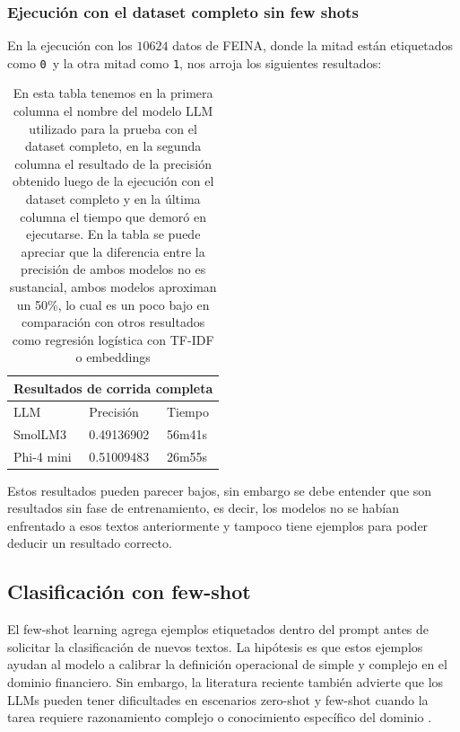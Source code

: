 \documentclass[12pt]{article}
\newcommand{\claseSimple}{\texttt{0}}
\newcommand{\claseCompleja}{\texttt{1}}
\begin{document}
\subsubsection{Ejecución con el dataset completo sin few shots}

En la ejecución con los $10624$ datos de FEINA, donde la mitad están etiquetados como \claseSimple \ y la otra mitad como \claseCompleja, nos arroja los siguientes resultados:

\begin{table}[H]
\centering
\begin{tabular}{lll}
\multicolumn{3}{c}{Resultados de corrida completa} \\
\toprule
LLM & Precisión & Tiempo \\
\midrule
SmolLM3 & 0.49136902 & 56m41s \\
Phi-4 mini & 0.51009483 & 26m55s \\
\bottomrule
\end{tabular}
\caption{En esta tabla tenemos en la primera columna el nombre del modelo LLM utilizado para la prueba con el dataset completo, en la segunda columna el resultado de la precisión obtenido luego de la ejecución con el dataset completo y en la última columna el tiempo que demoró en ejecutarse. En la tabla se puede apreciar que la diferencia entre la precisión de ambos modelos no es sustancial, ambos modelos aproximan un 50\%, lo cual es un poco bajo en comparación con otros resultados como regresión logística con TF-IDF o embeddings}
\end{table}

Estos resultados pueden parecer bajos, sin embargo se debe entender que son resultados sin fase de entrenamiento, es decir, los modelos no se habían enfrentado a esos textos anteriormente y tampoco tiene ejemplos para poder deducir un resultado correcto.

\subsection{Clasificación con few-shot}

El few-shot learning agrega ejemplos etiquetados dentro del prompt antes de solicitar la clasificación de nuevos textos. La hipótesis es que estos ejemplos ayudan al modelo a calibrar la definición operacional de simple y complejo en el dominio financiero. Sin embargo, la literatura reciente también advierte que los LLMs pueden tener dificultades en escenarios zero-shot y few-shot cuando la tarea requiere razonamiento complejo o conocimiento específico del dominio \cite{chamieh2024llms}.
\end{document}
